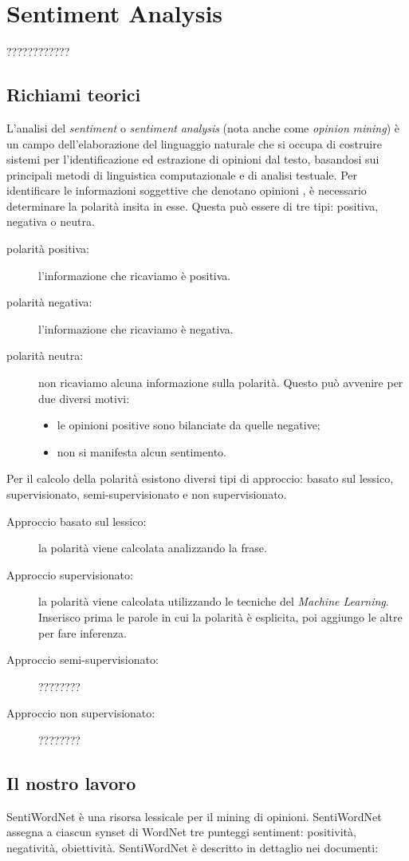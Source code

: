 \chapter{Sentiment Analysis}
	????????????
	
	\section{Richiami teorici}
		L'analisi del \textit{sentiment} o \textit{sentiment} \textit{analysis} (nota anche come \textit{opinion} \textit{mining}) è un campo dell'elaborazione del linguaggio naturale che si occupa di costruire sistemi per l'identificazione ed estrazione di opinioni dal testo, basandosi sui principali metodi di linguistica computazionale e di analisi testuale. Per identificare le informazioni soggettive che denotano opinioni , è necessario determinare la polarità insita in esse. Questa può essere di tre tipi: positiva, negativa o neutra.
		
		\begin{description}
			\item [polarità positiva:] l'informazione che ricaviamo è positiva.
			\item [polarità negativa:] l'informazione che ricaviamo è negativa.
			\item [polarità neutra:] non ricaviamo alcuna informazione sulla polarità. Questo può avvenire per due diversi motivi:
			
			\begin{itemize}
				\item le opinioni positive sono bilanciate da quelle negative;
				\item non si manifesta alcun sentimento.
			\end{itemize}
			
		\end{description}
	
		Per il calcolo della polarità esistono diversi tipi di approccio: basato sul lessico, supervisionato, semi-supervisionato e non supervisionato.
		
		\begin{description}
			\item [Approccio basato sul lessico:] la polarità viene calcolata analizzando la frase.
			\item [Approccio supervisionato:] la polarità viene calcolata utilizzando le tecniche del \textit{Machine Learning}. Inserisco prima le parole in cui la polarità è esplicita, poi aggiungo le altre per fare inferenza.
			\item [Approccio semi-supervisionato:] ????????
			\item [Approccio non supervisionato:] ????????	
		\end{description}
		
	\section{Il nostro lavoro}
		
		SentiWordNet è una risorsa lessicale per il mining di opinioni. SentiWordNet assegna a ciascun synset di WordNet tre punteggi sentiment: positività, negatività, obiettività. SentiWordNet è descritto in dettaglio nei documenti: